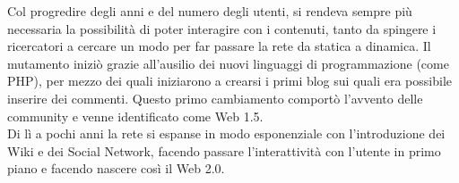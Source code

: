 \documentclass{report}%
\theoremstyle{plain}
\begin{document}
Col progredire degli anni e del numero degli utenti, si rendeva sempre più necessaria la possibilità di poter interagire con i contenuti, tanto da spingere i ricercatori a cercare un modo per far passare la rete da statica a dinamica. Il mutamento iniziò grazie all'ausilio dei nuovi linguaggi di programmazione (come PHP), per mezzo dei quali iniziarono a crearsi i primi blog sui quali era possibile inserire dei commenti. Questo primo cambiamento comportò l'avvento delle community e venne identificato come Web 1.5. \\Di lì a pochi anni la rete si espanse in modo esponenziale con l'introduzione dei Wiki e dei Social Network, facendo passare l'interattività con l'utente in primo piano e facendo nascere così il Web 2.0.
\end{document}
